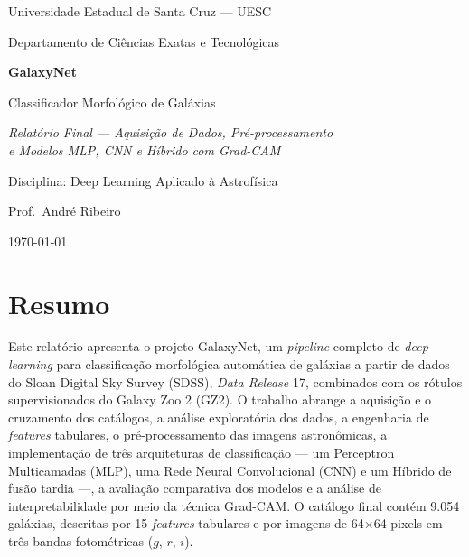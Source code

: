\documentclass[12pt, a4paper]{article}
\begin{document}
\begin{titlepage}
  \centering
  \vspace*{2cm}
  {\Large Universidade Estadual de Santa Cruz --- UESC \par}
  \vspace{0.4cm}
  {\large Departamento de Ciências Exatas e Tecnológicas \par}
  \vspace{3cm}
  {\Huge\bfseries GalaxyNet \par}
  \vspace{0.5cm}
  {\LARGE Classificador Morfológico de Galáxias \par}
  \vspace{0.8cm}
  {\large\itshape Relatório Final --- Aquisição de Dados, Pré-processamento\\
   e Modelos MLP, CNN e Híbrido com Grad-CAM \par}
  \vfill
  {\large Disciplina: Deep Learning Aplicado à Astrofísica \par}
  \vspace{0.3cm}
  {\large Prof.\ André Ribeiro \par}
  \vspace{1cm}
  {\large \today \par}
\end{titlepage}

\tableofcontents
\newpage

\section{Resumo}

Este relatório apresenta o projeto GalaxyNet, um \textit{pipeline} completo de
\textit{deep learning} para classificação morfológica automática de galáxias
a partir de dados do Sloan Digital Sky Survey (SDSS), \textit{Data Release}
17, combinados com os rótulos supervisionados do Galaxy Zoo 2 (GZ2). O
trabalho abrange a aquisição e o cruzamento dos catálogos, a análise
exploratória dos dados, a engenharia de \textit{features} tabulares, o
pré-processamento das imagens astronômicas, a implementação de três
arquiteturas de classificação --- um Perceptron Multicamadas (MLP), uma Rede
Neural Convolucional (CNN) e um Híbrido de fusão tardia ---, a
avaliação comparativa dos modelos e a análise de interpretabilidade por
meio da técnica Grad-CAM. O catálogo final contém 9.054 galáxias, descritas
por 15 \textit{features} tabulares e por imagens de 64$\times$64 pixels em
três bandas fotométricas ($g$, $r$, $i$).
\end{document}
